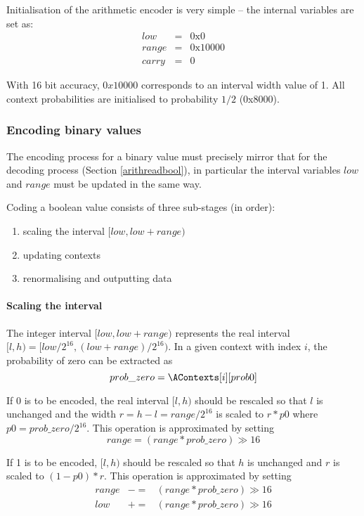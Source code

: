\begin{informative*}
Initialisation of the arithmetic encoder is very simple -- the internal variables are
set as:
\begin{eqnarray*}
low&=&\text{0x0} \\
range&=&\text{0x10000} \\
carry&=&0
\end{eqnarray*}

With 16 bit accuracy, $0x10000$ corresponds to an interval width value of 1. All
context probabilities are initialised to probability $1/2$ (0x8000).

\subsubsection{Encoding binary values}
\label{arithwritebool}
The encoding process for a binary value must precisely mirror
that for the decoding process (Section \ref{arithreadbool}), in
particular the interval variables $low$ and $range$ must be
updated in the same way.

Coding a boolean value consists of three sub-stages (in order): 
\begin{enumerate}
\item{scaling the interval $[low,low+range)$}
\item{updating contexts}
\item{renormalising and outputting data}
\end{enumerate}

\paragraph*{Scaling the interval\\}
The integer interval $[low,low+range)$ represents the real interval
$[l,h)=[low/2^{16},(low+range)/2^{16})$. In a given context with index $i$,
the probability of zero can be extracted as 
\[prob\_zero=\AContexts[i][prob0]\]

If $0$ is to be encoded, the real interval $[l,h)$
should be rescaled so that $l$ is unchanged and the
width $r=h-l=range/2^{16}$ is scaled to $r*p0$ where $p0=prob\_zero/2^{16}$.
This operation is approximated by setting
\[range=(range*prob\_zero)\gg 16\]

If 1 is to be encoded, $[l,h)$ should be rescaled so that $h$ is
unchanged and $r$ is scaled to $(1-p0)*r$. This operation is
approximated by setting
\begin{eqnarray*}
range & -= & (range*prob\_zero)\gg 16 \\
low &+= & (range*prob\_zero)\gg 16 
\end{eqnarray*}


\end{informative*}
